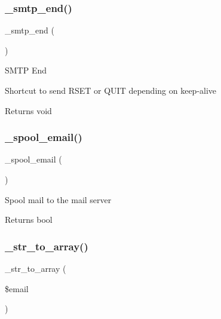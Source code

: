 \subsubsection{\texorpdfstring{\+\_\+smtp\+\_\+end()}{\_smtp\_end()}}
{\footnotesize\ttfamily \+\_\+smtp\+\_\+end (\begin{DoxyParamCaption}{ }\end{DoxyParamCaption})\hspace{0.3cm}{\ttfamily [protected]}}

S\+M\+TP End

Shortcut to send R\+S\+ET or Q\+U\+IT depending on keep-\/alive

\begin{DoxyReturn}{Returns}
void 
\end{DoxyReturn}
\mbox{\label{class_c_i___email_a5d45a2f98c27332dfe78086c88eafd3c}} 
\subsubsection{\texorpdfstring{\+\_\+spool\+\_\+email()}{\_spool\_email()}}
{\footnotesize\ttfamily \+\_\+spool\+\_\+email (\begin{DoxyParamCaption}{ }\end{DoxyParamCaption})\hspace{0.3cm}{\ttfamily [protected]}}

Spool mail to the mail server

\begin{DoxyReturn}{Returns}
bool 
\end{DoxyReturn}
\mbox{\label{class_c_i___email_a64cd83e470ede0781d028d7198474d1c}} 
\subsubsection{\texorpdfstring{\+\_\+str\+\_\+to\+\_\+array()}{\_str\_to\_array()}}
{\footnotesize\ttfamily \+\_\+str\+\_\+to\+\_\+array (\begin{DoxyParamCaption}\item[{}]{\$email }\end{DoxyParamCaption})\hspace{0.3cm}{\ttfamily [protected]}}

